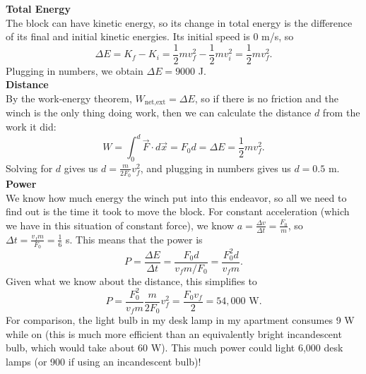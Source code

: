 \documentclass[]{article}
\begin{document}
\begin{TeacherMargin}
\begin{center}
\end{center}
\textbf{Total Energy} \\
The block can have kinetic energy, so its change in total energy is the difference of its final and initial kinetic energies. Its initial speed is 0 m/s, so
\[
\Delta E = K_{f}-K_{i} = \frac{1}{2}mv_{f}^{2} - \frac{1}{2}mv_{i}^{2} = \frac{1}{2}mv_{f}^{2}.
\]
Plugging in numbers, we obtain $\Delta E = 9000$ J. \\
\textbf{Distance} \\
By the work-energy theorem, $W_{\text{net,ext}} = \Delta E$, so if there is no friction and the winch is the only thing doing work, then we can calculate the distance $d$ from the work it did:
\[
W = \int_{0}^{d}\vec{F}\cdot d\vec{x} = F_{0} d = \Delta E = \frac{1}{2}mv_{f}^{2}.
\]
Solving for $d$ gives us $d = \frac{m}{2F_{0}}v_{f}^{2}$, and plugging in numbers gives us $d = 0.5$ m. \\
\textbf{Power} \\
We know how much energy the winch put into this endeavor, so all we need to find out is the time it took to move the block. For constant acceleration (which we have in this situation of constant force), we know $a = \frac{\Delta v}{\Delta t} = \frac{F_{0}}{m}$, so $\Delta t = \frac{v_{f}m}{F_{0}} = \frac{1}{6}$ s. This means that the power is
\[
P = \frac{\Delta E}{\Delta t} = \frac{F_{0}d}{v_{f}m/F_{0}} = \frac{F_{0}^{2}d}{v_{f}m}.
\]
Given what we know about the distance, this simplifies to
\[
P = \frac{F_{0}^{2}}{v_{f}m}\frac{m}{2F_{0}}v_{f}^{2} = \frac{F_{0}v_{f}}{2} = 54,000\text{ W}.
\]
For comparison, the light bulb in my desk lamp in my apartment consumes 9 W while on (this is much more efficient than an equivalently bright incandescent bulb, which would take about 60 W). This much power could light 6,000 desk lamps (or 900 if using an incandescent bulb)!
\end{TeacherMargin}
\end{document}
